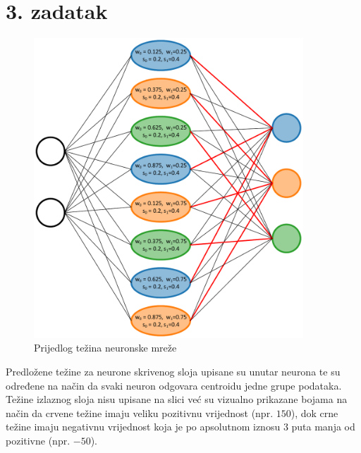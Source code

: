 \documentclass[12pt, a4paper, numeric]{article}
\begin{document}
\section*{3. zadatak}
\begin{figure}[ht!] 
    \centering
    \includegraphics[width=0.9\textwidth]{img/neural}
    \captionsetup{justification=centering}
    \caption{Prijedlog težina neuronske mreže}
    \label{fig:zad3}
\end{figure}
Predložene težine za neurone skrivenog sloja upisane su unutar neurona te su određene na način da svaki neuron odgovara centroidu jedne grupe podataka.
Težine izlaznog sloja nisu upisane na slici već su vizualno prikazane bojama na način da crvene težine imaju veliku pozitivnu vrijednost (npr. $150$), dok crne težine imaju negativnu vrijednost koja je po apsolutnom iznosu $3$ puta manja od pozitivne (npr. $-50$).
\pagebreak
\end{document}
